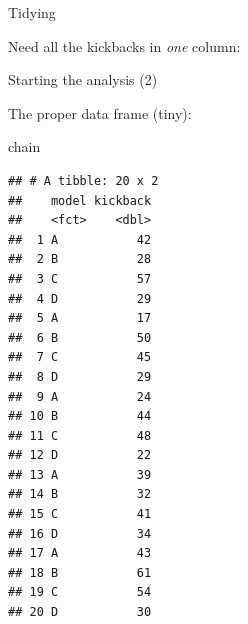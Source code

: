 \documentclass[ignorenonframetext,]{beamer}
\newenvironment{Shaded}{\begin{snugshade}}{\end{snugshade}}
\newcommand{\DataTypeTok}[1]{\textcolor[rgb]{0.13,0.29,0.53}{#1}}
\newcommand{\KeywordTok}[1]{\textcolor[rgb]{0.13,0.29,0.53}{\textbf{#1}}}
\newcommand{\NormalTok}[1]{#1}
\newcommand{\OperatorTok}[1]{\textcolor[rgb]{0.81,0.36,0.00}{\textbf{#1}}}
\newcommand{\StringTok}[1]{\textcolor[rgb]{0.31,0.60,0.02}{#1}}
\begin{document}
\begin{frame}[fragile]{Tidying}
\protect\hypertarget{tidying}{}

Need all the kickbacks in \emph{one} column:

\begin{Shaded}
\end{Shaded}

\end{frame}

\begin{frame}[fragile]{Starting the analysis (2)}
\protect\hypertarget{starting-the-analysis-2}{}

The proper data frame (tiny):

\tiny

\begin{Shaded}
\begin{Highlighting}[]
\NormalTok{chain }
\end{Highlighting}
\end{Shaded}

\begin{verbatim}
## # A tibble: 20 x 2
##    model kickback
##    <fct>    <dbl>
##  1 A           42
##  2 B           28
##  3 C           57
##  4 D           29
##  5 A           17
##  6 B           50
##  7 C           45
##  8 D           29
##  9 A           24
## 10 B           44
## 11 C           48
## 12 D           22
## 13 A           39
## 14 B           32
## 15 C           41
## 16 D           34
## 17 A           43
## 18 B           61
## 19 C           54
## 20 D           30
\end{verbatim}

\normalsize

\end{frame}
\end{document}

